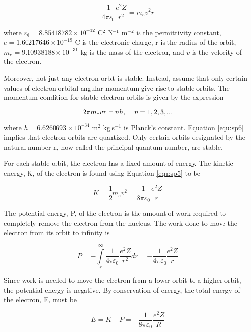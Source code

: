 \begin{equation}
\dfrac{1}{4\pi\varepsilon_0}\dfrac{e^2Z}{r^2}={m_ev^2}{r}
\label{equ:sp5}
\end{equation}

\noindent where $\varepsilon_0 = 8.85418782\times10^{-12}$ C$^2$ N$^{-1}$ m$^{-2}$ is the permittivity constant, $e = 1.60217646\times10^{-19}$ C is the electronic charge, r is the radius of the orbit, $m_e = 9.10938188\times10^{-31}$ kg is the mass of the electron, and $v$ is the velocity of the electron.

Moreover, not just any electron orbit is stable. Instead, assume that only certain values of electron orbital angular momentum give rise to stable orbits. The momentum condition for stable electron orbits is given by the expression

\begin{equation}
2\pi m_evr=nh,\hspace{4mm}n=1,2,3,...
\label{equ:sp6}
\end{equation}

\noindent where $h = 6.6260693\times10^{-34}$ m$^2$ kg s$^{-1}$ is Planck's constant. Equation \ref{equ:sp6} implies that electron orbits are quantized. Only certain orbits designated by the natural number n, now called the principal quantum number, are stable.

For each stable orbit, the electron has a fixed amount of energy. The kinetic energy, K, of the electron is found using Equation \ref{equ:sp5} to be

\begin{equation}
K=\dfrac{1}{2}m_ev^2=\dfrac{1}{8\pi\varepsilon_0}\dfrac{e^2Z}{r}
\label{equ:sp7}
\end{equation}

\noindent The potential energy, P, of the electron is the amount of work required to completely remove the electron from the nucleus. The work done to move the electron from its orbit to infinity is

\begin{equation}
P=-\int\limits_r^\infty\dfrac{1}{4\pi\varepsilon_0}\dfrac{e^2Z}{r^2}dr=-\dfrac{1}{4\pi\varepsilon_0}\dfrac{e^2Z}{r}
\label{equ:sp8}
\end{equation}

\noindent Since work is needed to move the electron from a lower orbit to a higher orbit, the potential energy is negative. By conservation of energy, the total energy of the electron, E, must be

\begin{equation}
E=K+P=-\dfrac{1}{8\pi\varepsilon_0}\dfrac{e^2Z}{R}
\label{equ:sp9}
\end{equation}

